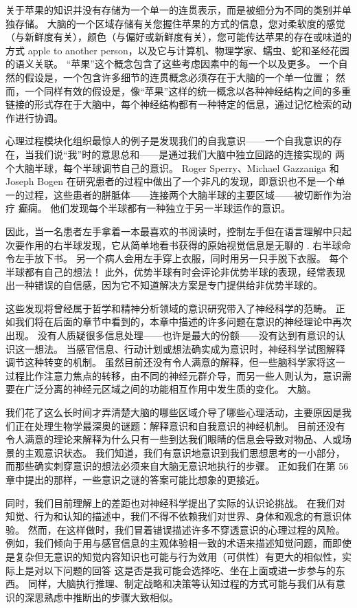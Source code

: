 关于苹果的知识并没有存储为一个单一的连贯表示，而是被细分为不同的类别并单独存储。 
大脑的一个区域存储有关您握住苹果的方式的信息，您对柔软度的感觉（与新鲜度有关），颜色（与偏好或新鲜度有关），您可能传达苹果的存在或味道的方式 apple to another person，以及它与计算机、物理学家、蠕虫、蛇和圣经花园的语义关联。 
“苹果”这个概念包含了这些考虑因素中的每一个以及更多。 
一个自然的假设是，一个包含许多细节的连贯概念必须存在于大脑的一个单一位置； 
然而，一个同样有效的假设是，像“苹果”这样的统一概念以各种神经结构之间的多重链接的形式存在于大脑中，每个神经结构都有一种特定的信息，通过记忆检索的动作进行协调。


心理过程模块化组织最惊人的例子是发现我们的自我意识——一个自我意识的存在，当我们说“我”时的意思总和——是通过我们大脑中独立回路的连接实现的 两个大脑半球，每个半球调节自己的意识。 
Roger Sperry、Michael Gazzaniga 和 Joseph Bogen 在研究患者的过程中做出了一个非凡的发现，即意识也不是一个单一的过程，这些患者的胼胝体——连接两个大脑半球的主要区域——被切断作为治疗 癫痫。 
他们发现每个半球都有一种独立于另一半球运作的意识。


因此，当一名患者左手拿着一本最喜欢的书阅读时，控制左手但在语言理解中只起次要作用的右半球发现，它从简单地看书获得的原始视觉信息是无聊的 . 右半球命令左手放下书。 
另一个病人会用左手穿上衣服，同时用另一只手脱下衣服。 每个半球都有自己的想法！ 
此外，优势半球有时会评论非优势半球的表现，经常表现出一种错误的自信感，因为它不知道解决方案是专门提供给非优势半球的。


这些发现将曾经属于哲学和精神分析领域的意识研究带入了神经科学的范畴。 
正如我们将在后面的章节中看到的，本章中描述的许多问题在意识的神经理论中再次出现。 
没有人质疑很多信息处理——也许是最大的份额——没有达到有意识的认识这一想法。 
当感官信息、行动计划或想法确实成为意识时，神经科学试图解释调节这种转变的机制。 
虽然目前还没有令人满意的解释，但一些脑科学家将这一过程比作注意力焦点的转移，由不同的神经元群介导，而另一些人则认为，意识需要在广泛分离的神经元区域之间的功能相互作用中发生质的变化。 大脑。


我们花了这么长时间才弄清楚大脑的哪些区域介导了哪些心理活动，主要原因是我们正在处理生物学最深奥的谜题：解释意识和自我意识的神经机制。 
目前还没有令人满意的理论来解释为什么只有一些到达我们眼睛的信息会导致对物品、人或场景的主观意识状态。 
我们知道，我们有意识地意识到我们思想思考的一小部分，而那些确实刺穿意识的想法必须来自大脑无意识地执行的步骤。 
正如我们在第 56 章中提出的那样，一些意识之谜的答案可能比想象的更接近。


同时，我们目前理解上的差距也对神经科学提出了实际的认识论挑战。 
在我们对知觉、行为和认知的描述中，我们不得不依赖我们对世界、身体和观念的有意识体验。 
然而，在这样做时，我们冒着错误描述许多不穿透意识的心理过程的风险。 
例如，我们倾向于用与感官信息的主观体验相一致的术语来描述知觉问题，而即使是复杂但无意识的知觉内容知识也可能与行为效用（可供性）有更大的相似性，实际上是对以下问题的回答 这是否是我可能会选择吃、坐在上面或进一步参与的东西。 
同样，大脑执行推理、制定战略和决策等认知过程的方式可能与我们从有意识的深思熟虑中推断出的步骤大致相似。


